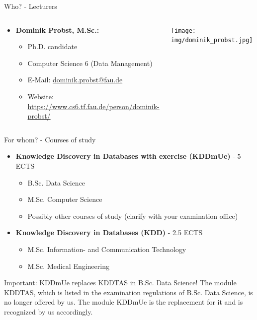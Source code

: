 \begin{frame}{Who? - Lecturers}
	\begin{columns}
		\begin{column}{0.8\textwidth}
			\begin{itemize}
				\item \textbf{Dominik Probst, M.Sc.:}
				      \begin{itemize}
					      \item Ph.D. candidate
					      \item Computer Science 6 (Data Management)
					      \item E-Mail: \href{mailto:dominik.probst@fau.de}{dominik.probst@fau.de}
					      \item Website: \url{https://www.cs6.tf.fau.de/person/dominik-probst/}
				      \end{itemize}
			\end{itemize}
		\end{column}
		\begin{column}{0.2\textwidth}
			\begin{center}
				\texttt{[image: img/dominik\_probst.jpg]}
			\end{center}
		\end{column}
	\end{columns}
\end{frame}

\begin{frame}{For whom? - Courses of study}
	\begin{itemize}
		\item \textbf{Knowledge Discovery in Databases with exercise (KDDmUe)} - 5 ECTS
		      \begin{itemize}
			      \item B.Sc. Data Science
			      \item M.Sc. Computer Science
			      \item {\color{gray} Possibly other courses of study (clarify with your examination office)}
		      \end{itemize}
		\item \textbf{Knowledge Discovery in Databases (KDD)} - 2.5 ECTS
		      \begin{itemize}
			      \item M.Sc. Information- and Communication Technology
			      \item M.Sc. Medical Engineering
		      \end{itemize}
	\end{itemize}

	\begin{alertblock}{Important: KDDmUe replaces KDDTAS in B.Sc. Data Science!}
		The module KDDTAS, which is listed in the examination regulations of B.Sc. Data Science, is no longer offered by us. The module KDDmUe is the replacement for it and is recognized by us accordingly.
	\end{alertblock}
\end{frame}

